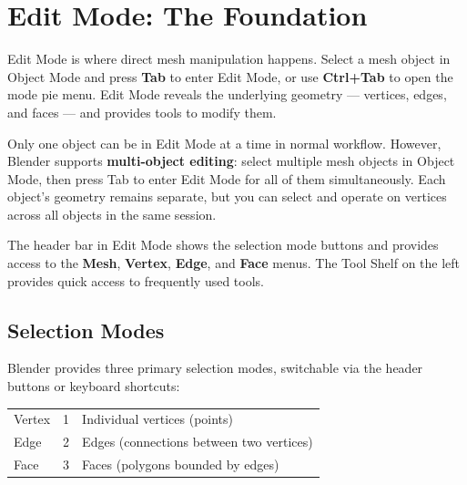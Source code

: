 
\section{Edit Mode: The Foundation}
\label{sec:editmode}

Edit Mode is where direct mesh manipulation happens. Select a mesh object in Object Mode and press \textbf{Tab} to enter Edit Mode, or use \textbf{Ctrl+Tab} to open the mode pie menu. Edit Mode reveals the underlying geometry --- vertices, edges, and faces --- and provides tools to modify them.

Only one object can be in Edit Mode at a time in normal workflow. However, Blender supports \textbf{multi-object editing}: select multiple mesh objects in Object Mode, then press Tab to enter Edit Mode for all of them simultaneously. Each object's geometry remains separate, but you can select and operate on vertices across all objects in the same session.

The header bar in Edit Mode shows the selection mode buttons and provides access to the \textbf{Mesh}, \textbf{Vertex}, \textbf{Edge}, and \textbf{Face} menus. The Tool Shelf on the left provides quick access to frequently used tools.

\subsection{Selection Modes}
\label{sec:selectionmodes}

Blender provides three primary selection modes, switchable via the header buttons or keyboard shortcuts:

\begin{shortcutbox}
\begin{center}
\begin{tabularx}{\textwidth}{L{3cm}C{3cm}X}
\toprule
{}
 &  &  \\
\midrule
Vertex & 1 & Individual vertices (points) \\
Edge & 2 & Edges (connections between two vertices) \\
Face & 3 & Faces (polygons bounded by edges) \\
\bottomrule
\end{tabularx}
\end{center}
\end{shortcutbox}

